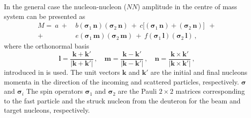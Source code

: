 \documentclass[twocolumn,epjc3]{svjour3}
\providecommand{\DIFaddtex}[1]{{\protect\color{Green} \sf #1}} %
\providecommand{\DIFdeltex}[1]{{\protect\color{Red} \scriptsize #1}} %
\providecommand{\DIFaddbegin}{} %
\providecommand{\DIFaddend}{} %
\providecommand{\DIFdelbegin}{} %
\providecommand{\DIFdelend}{} %
\providecommand{\DIFadd}[1]{\texorpdfstring{\DIFaddtex{#1}}{#1}} %
\providecommand{\DIFdel}[1]{\texorpdfstring{\DIFdeltex{#1}}{}} %
\newcommand{\DIFscaledelfig}{0.5}
\newlength{\DIFdelgraphicswidth} %
\newlength{\DIFdelgraphicsheight} %
\newcommand{\DIFaddincludegraphics}[2][]{{\color{blue}\fbox{\DIFOincludegraphics[#1]{#2}}}} %
\newcommand{\DIFdelincludegraphics}[2][]{%
\sbox{\DIFdelgraphicsbox}{\DIFOincludegraphics[#1]{#2}}%
\settoboxwidth{\DIFdelgraphicswidth}{\DIFdelgraphicsbox} %
\settoboxtotalheight{\DIFdelgraphicsheight}{\DIFdelgraphicsbox} %
\scalebox{\DIFscaledelfig}{%
\parbox[b]{\DIFdelgraphicswidth}{\usebox{\DIFdelgraphicsbox}\\[-\baselineskip] \rule{\DIFdelgraphicswidth}{0em}}\llap{\resizebox{\DIFdelgraphicswidth}{\DIFdelgraphicsheight}{%
\setlength{\unitlength}{\DIFdelgraphicswidth}%
\begin{picture}(1,1)%
\thicklines\linethickness{2pt} %
{\color[rgb]{1,0,0}\put(0,0){\framebox(1,1){}}}%
{\color[rgb]{1,0,0}\put(0,0){\line( 1,1){1}}}%
{\color[rgb]{1,0,0}\put(0,1){\line(1,-1){1}}}%
\end{picture}%
}\hspace*{3pt}}} %
} %
\DeclareRobustCommand{\DIFaddbegin}{\DIFOaddbegin \let\includegraphics\DIFaddincludegraphics} %
\DeclareRobustCommand{\DIFaddend}{\DIFOaddend \let\includegraphics\DIFOincludegraphics} %
\DeclareRobustCommand{\DIFdelbegin}{\DIFOdelbegin \let\includegraphics\DIFdelincludegraphics} %
\DeclareRobustCommand{\DIFdelend}{\DIFOaddend \let\includegraphics\DIFOincludegraphics} %
\begin{document}
In the general case the nucleon-nucleon ($NN$) amplitude in the centre of mass
system can be presented as \cite{gla02}
\begin{equation}
  \label{eq:mat_full}
  \DIFdelbegin %
\DIFdelend \DIFaddbegin \begin{split}
    M =\ a\ +\ &b
    (\boldsymbol{\sigma}_1\,\mathbf{n})
    (\boldsymbol{\sigma}_2\,\mathbf{n})\ +\ c\bigl[
    (\boldsymbol{\sigma}_1\,\mathbf{n}) +
    (\boldsymbol{\sigma}_2\,\mathbf{n})\bigr]\ \ + \\
    +\ &e
    (\boldsymbol{\sigma}_1\,\mathbf{m})
    (\boldsymbol{\sigma}_2\,\mathbf{m})\ +\ f
    (\boldsymbol{\sigma}_1\,\mathbf{l})
    (\boldsymbol{\sigma}_2\,\mathbf{l})\,,
  \end{split}\DIFaddend 
\end{equation}
where the orthonormal basis
\begin{equation}
  \mathbf{l} =
  \frac{\mathbf{k} + \mathbf{k}'}{|\mathbf{k} + \mathbf{k}'|}\,, \quad
  \mathbf{m} =
  \frac{\mathbf{k} - \mathbf{k}'}{|\mathbf{k} - \mathbf{k}'|}\,, \quad
  \mathbf{n} =
  \frac{\mathbf{k} \times \mathbf{k}'}{|\mathbf{k} \times \mathbf{k}'|}\,,
\end{equation}
introduced in \cite{gol66} is used. The unit vectors $\mathbf{k}$ and
$\mathbf{k}'$ are \DIFdelbegin \DIFdel{the initial and final nucleons momenta}\DIFdelend \DIFaddbegin \DIFadd{in the direction of the incoming and scattered particles}\DIFaddend ,
respectively. \DIFdelbegin \DIFdel{$\boldsymbol{\sigma}$ and
$\boldsymbol{\sigma}_i$ }\DIFdelend \DIFaddbegin \DIFadd{The spin operators $\boldsymbol{\sigma}_1$ and
$\boldsymbol{\sigma}_2$ }\DIFaddend are the Pauli $2\times2$ matrices \DIFdelbegin \DIFdel{corresponding to the fast particle and
the struck nucleon from the
deuteron}\DIFdelend \DIFaddbegin \DIFadd{for the beam and
target nucleons}\DIFaddend , respectively.
\end{document}
